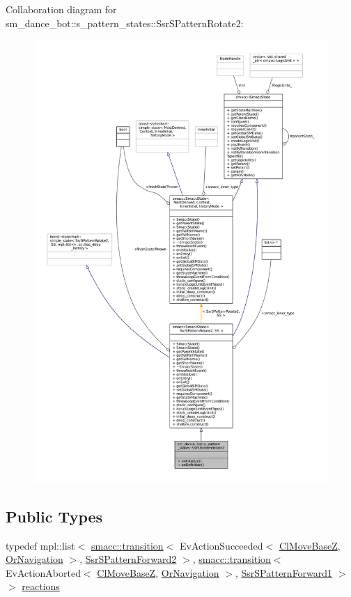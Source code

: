Collaboration diagram for sm\+\_\+dance\+\_\+bot\+:\+:s\+\_\+pattern\+\_\+states\+:\+:Ssr\+S\+Pattern\+Rotate2\+:
\nopagebreak
\begin{figure}[H]
\begin{center}
\leavevmode
\includegraphics[width=350pt]{structsm__dance__bot_1_1s__pattern__states_1_1SsrSPatternRotate2__coll__graph}
\end{center}
\end{figure}
\subsection*{Public Types}
\begin{DoxyCompactItemize}
\item 
typedef mpl\+::list$<$ \hyperlink{classsmacc_1_1transition}{smacc\+::transition}$<$ Ev\+Action\+Succeeded$<$ \hyperlink{classmove__base__z__client_1_1ClMoveBaseZ}{Cl\+Move\+BaseZ}, \hyperlink{classsm__dance__bot_1_1OrNavigation}{Or\+Navigation} $>$, \hyperlink{structsm__dance__bot_1_1s__pattern__states_1_1SsrSPatternForward2}{Ssr\+S\+Pattern\+Forward2} $>$, \hyperlink{classsmacc_1_1transition}{smacc\+::transition}$<$ Ev\+Action\+Aborted$<$ \hyperlink{classmove__base__z__client_1_1ClMoveBaseZ}{Cl\+Move\+BaseZ}, \hyperlink{classsm__dance__bot_1_1OrNavigation}{Or\+Navigation} $>$, \hyperlink{structsm__dance__bot_1_1s__pattern__states_1_1SsrSPatternForward1}{Ssr\+S\+Pattern\+Forward1} $>$ $>$ \hyperlink{structsm__dance__bot_1_1s__pattern__states_1_1SsrSPatternRotate2_a67e26e0b1fd32f089eb1f72abe01a46b}{reactions}
\end{DoxyCompactItemize}
